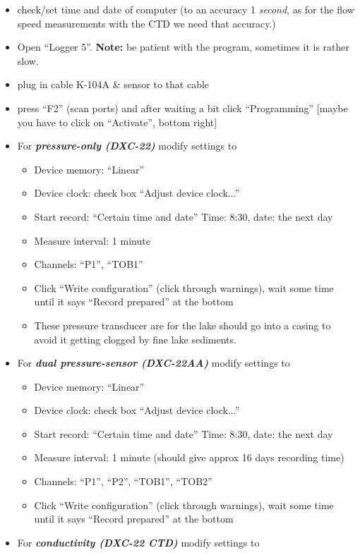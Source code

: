 \documentclass[DIV=15,halfparskip,11pt,headinclude]{scrartcl}
\begin{document}
\begin{itemize}
  \item check/set time and date of computer (to an accuracy 1
    \emph{second}, as for the flow speed measurements with the CTD we
    need that accuracy.)
  \item Open ``Logger 5''.  \textbf{Note:} be patient with the
    program, sometimes it is rather slow.
  \item plug in cable K-104A \& sensor to that cable
  \item press ``F2'' (scan ports) and after waiting a bit click
    ``Programming'' [maybe you have to click on ``Activate'', bottom right]
\item For \emph{\bf pressure-only (DXC-22)} modify settings to
  \begin{itemize}
  \item Device memory: ``Linear''
  \item Device clock: check box ``Adjust device clock...''
  \item Start record: ``Certain time and date''
    Time: 8:30, date: the next day
\item Measure interval: 1 minute
\item Channels: ``P1'', ``TOB1''
\item Click ``Write configuration'' (click through warnings), wait
  some time until it says ``Record prepared'' at the bottom
\item These pressure transducer are for the lake should go into a casing to avoid
it getting clogged by fine lake sediments.
\end{itemize}
\item For \emph{\bf dual pressure-sensor (DXC-22AA)} modify settings to
  \begin{itemize}
  \item Device memory: ``Linear''
  \item Device clock: check box ``Adjust device clock...''
  \item Start record: ``Certain time and date''
    Time: 8:30, date: the next day
\item Measure interval: 1 minute (should give approx 16 days recording time)
\item Channels: ``P1'', ``P2'', ``TOB1'', ``TOB2''
\item Click ``Write configuration'' (click through warnings), wait
  some time until it says ``Record prepared'' at the bottom
\end{itemize}
\item For \emph{\bf conductivity (DXC-22 CTD)} modify settings to

\end{itemize}
\end{document}
